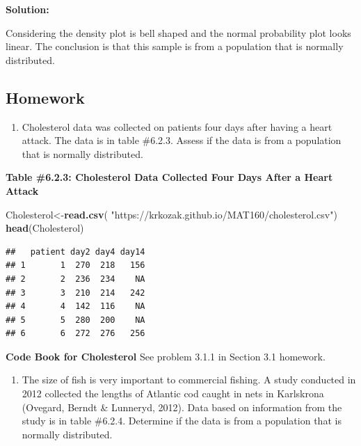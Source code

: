 \documentclass[
]{book}
\newenvironment{Shaded}{\begin{snugshade}}{\end{snugshade}}
\newcommand{\KeywordTok}[1]{\textcolor[rgb]{0.13,0.29,0.53}{\textbf{#1}}}
\newcommand{\NormalTok}[1]{#1}
\newcommand{\StringTok}[1]{\textcolor[rgb]{0.31,0.60,0.02}{#1}}
\providecommand{\tightlist}{%
  \setlength{\itemsep}{0pt}\setlength{\parskip}{0pt}}
\begin{document}
\textbf{Solution:}

Considering the density plot is bell shaped and the normal probability plot looks linear. The conclusion is that this sample is from a population that is normally distributed.

\hypertarget{homework-14}{%
\subsection{Homework}\label{homework-14}}

\begin{enumerate}
\def\labelenumi{\arabic{enumi}.}
\tightlist
\item
  Cholesterol data was collected on patients four days after having a heart attack. The data is in table \#6.2.3. Assess if the data is from a population that is normally distributed.
\end{enumerate}

\textbf{Table \#6.2.3: Cholesterol Data Collected Four Days After a Heart Attack}

\begin{Shaded}
\begin{Highlighting}[]
\NormalTok{Cholesterol<-}\KeywordTok{read.csv}\NormalTok{(}
  \StringTok{"https://krkozak.github.io/MAT160/cholesterol.csv"}\NormalTok{)}
\KeywordTok{head}\NormalTok{(Cholesterol)}
\end{Highlighting}
\end{Shaded}

\begin{verbatim}
##   patient day2 day4 day14
## 1       1  270  218   156
## 2       2  236  234    NA
## 3       3  210  214   242
## 4       4  142  116    NA
## 5       5  280  200    NA
## 6       6  272  276   256
\end{verbatim}

\textbf{Code Book for Cholesterol} See problem 3.1.1 in Section 3.1 homework.

\begin{enumerate}
\def\labelenumi{\arabic{enumi}.}
\setcounter{enumi}{1}
\tightlist
\item
  The size of fish is very important to commercial fishing. A study conducted in 2012 collected the lengths of Atlantic cod caught in nets in Karlskrona (Ovegard, Berndt \& Lunneryd, 2012). Data based on information from the study is in table \#6.2.4. Determine if the data is from a population that is normally distributed.
\end{enumerate}
\end{document}
